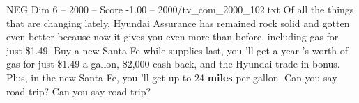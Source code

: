 \begin{textsample}{NEG Dim 6 – 2000 – Score -1.00 – 2000/tv\_com\_2000\_102.txt}  \label{ex:f6_neg_010}
Of all the things that are changing lately, Hyundai Assurance has remained rock solid and gotten even better because now it gives you even more than before, including gas for just \$1.49.
Buy a new Santa Fe while supplies last, you 'll get a year 's worth of gas for just \$1.49 a gallon, \$2,000 cash back, and the Hyundai trade-in bonus.
Plus, in the new Santa Fe, you 'll get up to 24 \textbf{miles} per gallon.
Can you say road trip?
Can you say road trip?

\end{textsample}
